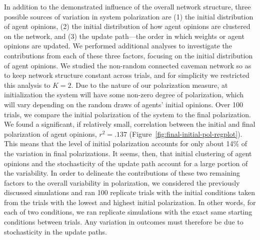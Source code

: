 In addition to the demonstrated influence of the overall network structure, three possible sources of  variation in system polarization are (1) the initial distribution of agent opinions, (2) the initial distribution of how agent opinions are clustered on the network, and (3) the update path---the order in which weights or agent opinions are updated. We performed additional analyses to investigate the contributions from each of these three factors, focusing on the initial distribution of agent opinions. We studied the non-random connected caveman network so as to keep network structure constant across trials, and for simplicity we restricted this analysis to $K=2$. 
Due to the nature of our polarization measure, at initialization the system will have some non-zero degree of polarization, which will vary depending on the random draws of agents' initial opinions. Over 100 trials, we compare the initial polarization of the system to the final polarization.    
We found a significant, if relatively small, correlation between the initial and final polarization of agent opinions, $r^2=.137$ (Figure~\ref{fig:final-initial-pol-regplot}). 
This means that the level of initial polarization accounts for only about 14\% of the 
variation in final polarizations.
It seems, then, that initial clustering of agent opinions and the stochasticity of the update path account for a large portion of the variability. In order to delineate the contributions of these two remaining factors to the overall variability in polarization, we considered the previously discussed simulations and ran 100 replicate trials with the initial conditions taken from the trials with the lowest and highest initial polarization. In other words, for each of two conditions, we ran replicate simulations with the exact same starting conditions between trials. Any variation in outcomes must therefore be due to stochasticity in the update paths. 
